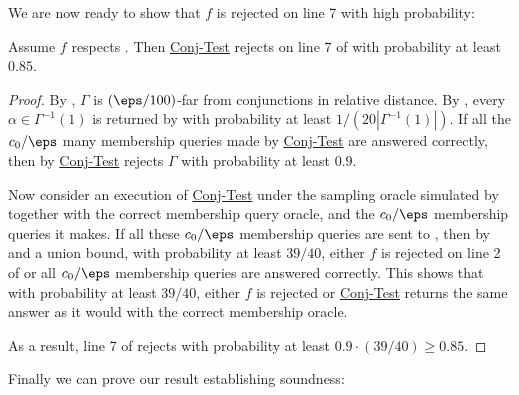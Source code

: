 \documentclass[11pt]{article}
\theoremstyle{definition}
\begin{document}
We are now ready to show that $f$
  is rejected on line 7 with high probability:
\begin{lemma}\label{thm: gamma is rejected whp}
    Assume $f$ respects . Then  \hyperlink{Algorithm2}{\sc Conj-Test}
    rejects on line $7$ of  with probability at least $0.85$.
\end{lemma}
\begin{proof}
By , $\Gamma$ is $(\eps/100)$-far from conjunctions in relative distance.
By , every $\alpha \in \Gamma^{-1}(1)$ is returned by   with probability at least $1/(20|\Gamma^{-1}(1)|)$.
If all the $c_0/\eps$ many membership queries made by \hyperlink{Algorithm2}{\sc Conj-Test} are answered correctly, then
  by  \hyperlink{Algorithm2}{\sc Conj-Test} rejects $\Gamma$ 
  with probability at least $0.9$.

Now consider an execution of \hyperlink{Algorithm2}{\sc Conj-Test}
  under the sampling oracle simulated by  together with the correct membership query oracle,
  and the $c_0/\eps$ membership queries it makes.
If all these $c_0/\eps$ membership queries are sent to
  , then
by  and a union bound, with
  probability at least $39/40$, either $f$ is rejected on line {2}
of  or all $c_0/\eps$ membership queries are 
  answered correctly.
This shows that with probability at least $39/40$, either
  $f$ is rejected or \hyperlink{Algorithm2}{\sc Conj-Test} returns the same answer as it would with the correct membership oracle.




   

As a result, line 7 of  rejects with probability at least $0.9 \cdot (39/40)\ge 0.85$.  \end{proof}




















Finally we can prove our result establishing soundness:
\end{document}
